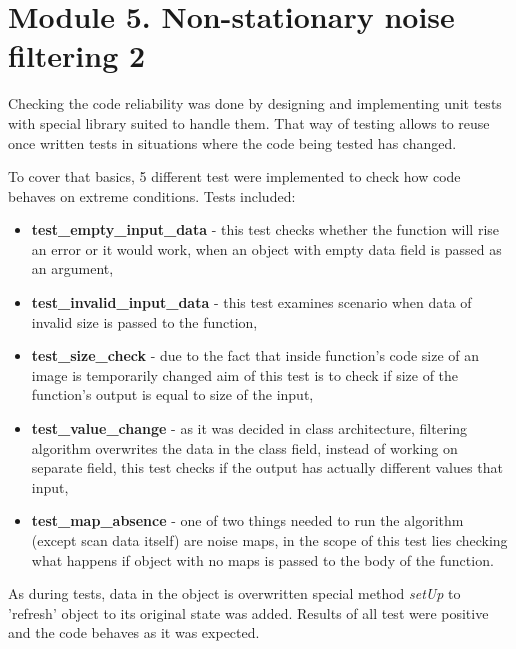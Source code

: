 \section{Module 5. Non-stationary noise filtering 2}

Checking the code reliability was done by designing and implementing unit tests with special library suited to handle them. That way of testing allows to reuse once written tests in situations where the code being tested has changed.

To cover that basics, 5 different test were implemented to check how code behaves on extreme conditions. Tests included:
\begin{itemize}
	\item \textbf{test\_empty\_input\_data} - this test checks whether the function will rise an error or it would work, when an object with empty data field is passed as an argument,
	\item \textbf{test\_invalid\_input\_data} - this test examines scenario when data of invalid size is passed to the function,
	\item \textbf{test\_size\_check} - due to the fact that inside function's code size of an image is temporarily changed aim of this test is to check if size of the function's output is equal to size of the input,
	\item \textbf{test\_value\_change} - as it was decided in class architecture, filtering algorithm overwrites the data in the class field, instead of working on separate field, this test checks if the output has actually different values that input,
	\item \textbf{test\_map\_absence} - one of two things needed to run the algorithm (except scan data itself) are noise maps, in the scope of this test lies checking what happens if object with no maps is passed to the body of the function.
\end{itemize}

As during tests, data in the object is overwritten special method \textit{setUp} to 'refresh' object to its original state was added. Results of all test were positive and the code behaves as it was expected. 

